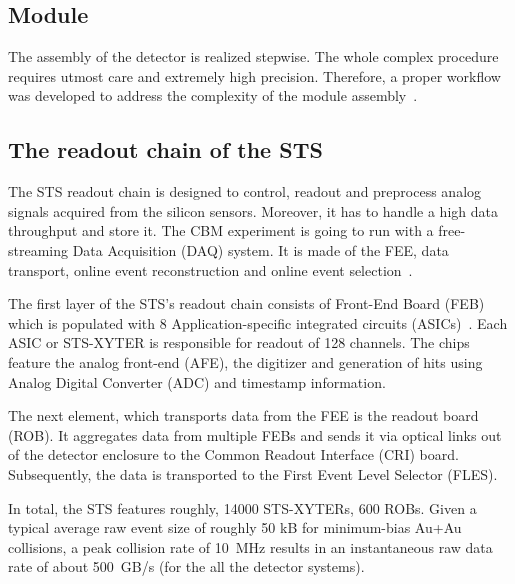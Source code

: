 \subsection{Module}
\label{module}
 The assembly of the detector is realized stepwise. The whole complex procedure requires utmost care and extremely high precision. Therefore, a proper workflow was developed to address the complexity of the module assembly~\cite{carmen2}.

\subsection{The readout chain of the STS}
\label{readout}
\label{DAQ}
The \gls{STS} readout chain is designed to control, readout and preprocess analog signals acquired from the silicon sensors. Moreover, it has to handle a high data throughput and store it. The \gls{CBM} experiment is going to run with a free-streaming Data Acquisition (\gls{DAQ}) system. It is made of the \gls{FEE}, data transport, online event reconstruction and online event selection~\cite{Kasinski1}.

The first layer of the \gls{STS}'s readout chain consists of Front-End Board (\gls{FEB}) which is populated with 8  Application-specific integrated circuits (ASICs)~\cite{Kasinski2}. Each ASIC or STS-XYTER is responsible for readout of 128 channels. The chips feature the analog front-end (\gls{AFE}), the digitizer and generation of hits using Analog Digital Converter (\gls{ADC}) and timestamp information. 

The next element, which transports data from the \gls{FEE} is the readout board (\gls{ROB}). It aggregates data from multiple \glspl{FEB} and sends it via optical links out of the detector enclosure to the Common Readout Interface (\gls{CRI}) board. Subsequently, the data is transported to the First Event Level Selector (\gls{FLES}). 

In total, the \gls{STS} features roughly, 14000 STS-XYTERs, 600 \glspl{ROB}. Given a typical average raw event size of roughly 50 kB for minimum-bias Au+Au collisions, a peak collision rate of 10~MHz results in an instantaneous raw data rate of about 500~GB/s (for the all the detector systems).

